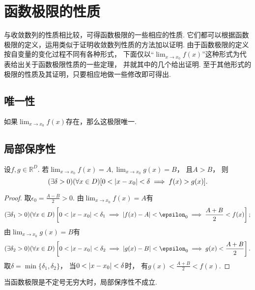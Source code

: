 \section{函数极限的性质}
与收敛数列的性质相比较，可得函数极限的一些相应的性质.
它们都可以根据函数极限的定义，运用类似于证明收敛数列性质的方法加以证明.
由于函数极限的定义按自变量的变化过程不同有各种形式，
下面仅以“\(\lim_{x \to x_0}f(x)\)”这种形式为代表给出关于函数极限性质的一些定理，
并就其中的几个给出证明.
至于其他形式的极限的性质及其证明，只要相应地做一些修改即可得出.

\subsection{唯一性}
\begin{theorem}[唯一性]\label{theorem:极限.函数极限的唯一性}
如果\(\lim_{x \to x_0} f(x)\)存在，那么这极限唯一.
\end{theorem}

\subsection{局部保序性}
\begin{theorem}[局部保序性]\label{theorem:极限.函数极限的局部保序性1}
设\(f,g\in\mathbb{R}^D\).
若\(\lim_{x\to x_0} f(x) = A,
\lim_{x\to x_0} g(x) = B\)，
且\(A>B\)，
则\[
	(\exists\delta>0)
	(\forall x\in D)
	[0<\abs{x-x_0}<\delta \implies f(x)>g(x)].
\]
\begin{proof}
取\(\epsilon_0=\frac{A-B}2>0\).
由\(\lim_{x\to x_0} f(x) = A\)有\[
	(\exists\delta_1>0)
	(\forall x\in D)
	\left[
		0<\abs{x - x_0}<\delta_1
		\implies
		\abs{f(x) - A}<\epsilon_0
		\implies
		\frac{A+B}2 < f(x)
	\right];
\]
由\(\lim_{x\to x_0} g(x) = B\)有\[
	(\exists\delta_2>0)
	(\forall x\in D)
	\left[
		0<\abs{x - x_0}<\delta_2
		\implies
		\abs{g(x) - B}<\epsilon_0
		\implies
		g(x) < \frac{A+B}2
	\right].
\]
取\(\delta=\min\{\delta_1,\delta_2\}\)，
当\(0<\abs{x-x_0}<\delta\)时，
有\(g(x) < \frac{A+B}2 < f(x)\).
\end{proof}
\end{theorem}

\begin{remark}
当函数极限是不定号无穷大时，局部保序性不成立.
\end{remark}

